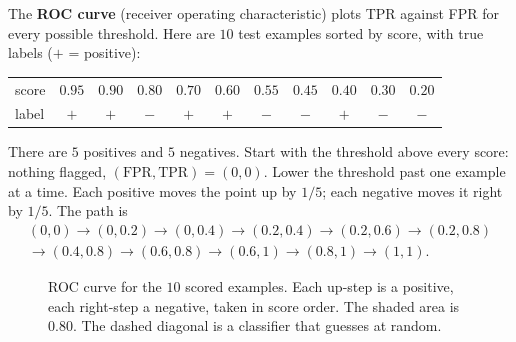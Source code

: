 The \textbf{ROC curve} (receiver operating characteristic) plots TPR against FPR for every
possible threshold. Here are $10$ test examples sorted by score, with true labels ($+$ = positive):

\begin{center}
\begin{tabular}{l*{10}{c}}
\toprule
score & $0.95$ & $0.90$ & $0.80$ & $0.70$ & $0.60$ & $0.55$ & $0.45$ & $0.40$ & $0.30$ & $0.20$\\
label & $+$ & $+$ & $-$ & $+$ & $+$ & $-$ & $-$ & $+$ & $-$ & $-$\\
\bottomrule
\end{tabular}
\end{center}

There are $5$ positives and $5$ negatives. Start with the threshold above every score: nothing
flagged, $(\text{FPR},\text{TPR})=(0,0)$. Lower the threshold past one example at a time. Each
positive moves the point up by $1/5$; each negative moves it right by $1/5$. The path is
\[
\begin{gathered}
(0,0)\to(0,0.2)\to(0,0.4)\to(0.2,0.4)\to(0.2,0.6)\to(0.2,0.8)\\
\to(0.4,0.8)\to(0.6,0.8)\to(0.6,1)\to(0.8,1)\to(1,1).
\end{gathered}
\]

\begin{figure}[H]
\centering
{}
\caption{ROC curve for the $10$ scored examples. Each up-step is a positive, each right-step a
negative, taken in score order. The shaded area is $0.80$. The dashed diagonal is a classifier
that guesses at random.}
\label{fig:ml-roc}
\end{figure}

